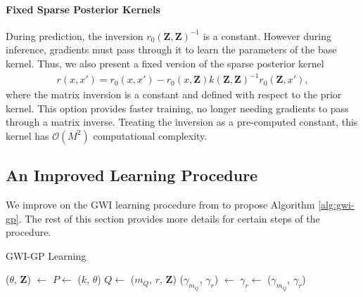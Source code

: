 \documentclass{article}
\numberwithin{equation}{section}
\begin{document}
\paragraph{Fixed Sparse Posterior Kernels}
During prediction, the inversion $r_0\left(\mathbf{Z}, \mathbf{Z}\right)^{-1}$ is a constant. However during inference, gradients must pass through it to learn the parameters of the base kernel. Thus, we also present a fixed version of the sparse posterior kernel
\begin{align}
    r(x, x') = r_0(x, x') - r_0\left(x, \mathbf{Z}\right) k\left(\mathbf{Z}, \mathbf{Z}\right)^{-1} r_0\left(\mathbf{Z}, x'\right),
\end{align}
where the matrix inversion is a constant and defined with respect to the prior kernel. This option provides faster training, no longer needing gradients to pass through a matrix inverse. Treating the inversion as a pre-computed constant, this kernel has $\mathcal{O}(M^2)$ computational complexity.

\subsection{An Improved Learning Procedure}
We improve on the GWI learning procedure from \cite{wild2022generalized} to propose Algorithm \ref{alg:gwi-gp}.
The rest of this section provides more details for certain steps of the procedure.
\begin{algorithm}[h!]
\caption{GWI-GP Learning}\label{alg:gwi-gp}
\begin{algorithmic}
     
    \State ($\theta$, $\mathbf{Z}$) $\leftarrow$  
    \State $P \leftarrow$ ($k$, $\theta$) 
    \State $Q \leftarrow$ ($m_Q$, $r$, $\mathbf{Z}$) 
    \State ($\gamma_{m_Q}$, $\gamma_r$) $\leftarrow$  
    \State $\gamma_r \leftarrow$  
    \State \Return ($\gamma_{m_Q}$, $\gamma_r$)
\end{algorithmic}
\end{algorithm}
\end{document}
